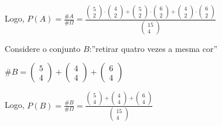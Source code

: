 \documentclass[portuguese]{article}
\begin{document}
Logo, $P(A)=\frac{\#A}{\#\Omega}=\frac{\left(\begin{array}{c}
5\\
2
\end{array}\right)\cdot\left(\begin{array}{c}
4\\
2
\end{array}\right)+\left(\begin{array}{c}
5\\
2
\end{array}\right)\cdot\left(\begin{array}{c}
6\\
2
\end{array}\right)+\left(\begin{array}{c}
4\\
2
\end{array}\right)\cdot\left(\begin{array}{c}
6\\
2
\end{array}\right)}{\left(\begin{array}{c}
15\\
4
\end{array}\right)}$

Considere o conjunto $B$:''retirar quatro vezes a mesma cor''

$\#B=\left(\begin{array}{c}
5\\
4
\end{array}\right)+\left(\begin{array}{c}
4\\
4
\end{array}\right)+\left(\begin{array}{c}
6\\
4
\end{array}\right)$

Logo, $P(B)=\frac{\#B}{\#\Omega}=\frac{\left(\begin{array}{c}
5\\
4
\end{array}\right)+\left(\begin{array}{c}
4\\
4
\end{array}\right)+\left(\begin{array}{c}
6\\
4
\end{array}\right)}{\left(\begin{array}{c}
15\\
4
\end{array}\right)}$
\end{document}
